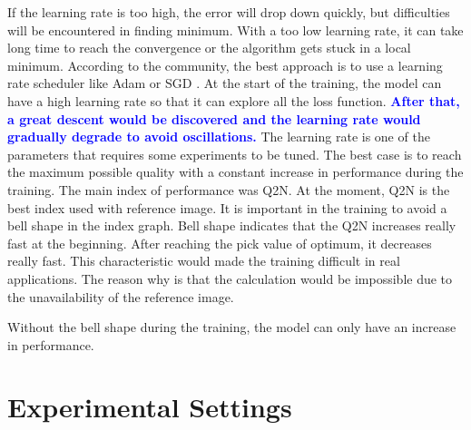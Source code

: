 \documentclass[12pt]{report}
\newcommand{\bb}[1]{\textcolor{blue}{\textbf{#1}}}
\begin{document}
If the learning rate is too high, the error will drop down quickly, but difficulties will be encountered in finding minimum.
With a too low learning rate, it can take long time to reach the convergence or the algorithm gets stuck in a local minimum.
According to the community, the best approach is to use a learning rate scheduler like Adam \cite{adam} or SGD \cite{sgd}.
At the start of the training, the model can have a high learning rate so that it can explore all the loss function.
\bb{After that, a great descent would be discovered and the learning rate would gradually degrade to avoid oscillations.}
The learning rate is one of the parameters that requires some experiments to be tuned.
The best case is to reach the maximum possible quality with a constant increase in performance during the training.
The main index of performance was Q2N. At the moment, Q2N is the best index used with reference image.
It is important in the training to avoid a bell shape in the index graph. Bell shape indicates that the Q2N increases really fast at the beginning.
After reaching the pick value of optimum, it decreases really fast. 
This characteristic would made the training difficult in real applications.
The reason why is that the calculation would be impossible due to the unavailability of the reference image.

Without the bell shape during the training, the model can only have an increase in performance.


\section{Experimental Settings}
\end{document}

